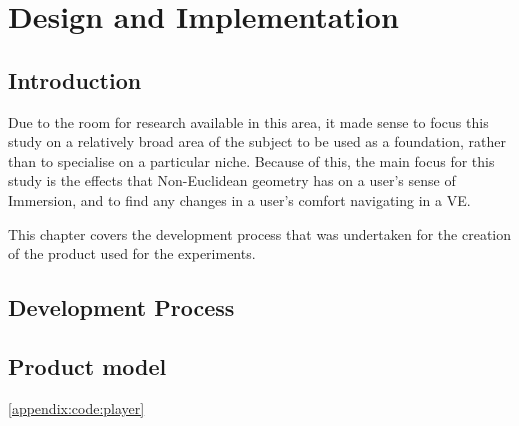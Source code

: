 \chapter[Product]{Design and Implementation}
\label{design}

\begin{multicols*}{2}

	\section{Introduction}

		Due to the room for research available in this area, it made sense to focus this study on a relatively broad area of the subject to be used as a foundation, rather than to specialise on a particular niche.
		Because of this, the main focus for this study is the effects that Non-Euclidean geometry has on a user's sense of Immersion, and to find any changes in a user's comfort navigating in a VE.

		This chapter covers the development process that was undertaken for the creation of the product used for the experiments.

	\section{Development Process}





	\section{Product model}
		\autoref{appendix:code:player}

\end{multicols*}

